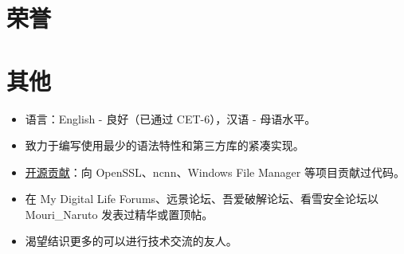 \documentclass{resume}
\begin{document}
\section{荣誉}


\section{其他}
\begin{itemize}

  \item 语言：English - 良好（已通过 CET-6），汉语 - 母语水平。

  \item 致力于编写使用最少的语法特性和第三方库的紧凑实现。

  \item \href{https://github.com/search?q=is%3Apr+author%3AMouriNaruto&type=Issues}{开源贡献}：向 OpenSSL、ncnn、Windows File Manager 等项目贡献过代码。
  
  \item 在 My Digital Life Forums、远景论坛、吾爱破解论坛、看雪安全论坛以 Mouri\_Naruto 发表过精华或置顶帖。
  
  \item 渴望结识更多的可以进行技术交流的友人。
  
\end{itemize}
\end{document}
